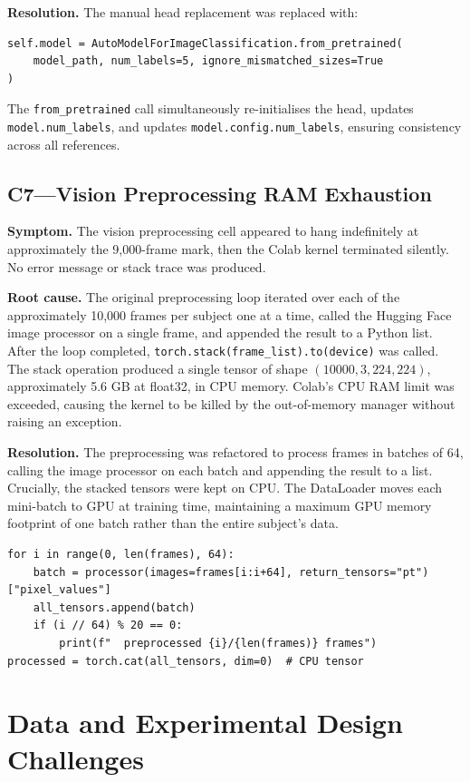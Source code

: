 \textbf{Resolution.} The manual head replacement was replaced with:

\begin{verbatim}
self.model = AutoModelForImageClassification.from_pretrained(
    model_path, num_labels=5, ignore_mismatched_sizes=True
)
\end{verbatim}

The \texttt{from\_pretrained} call simultaneously re-initialises the head, updates \texttt{model.num\_labels}, and updates \texttt{model.config.num\_labels}, ensuring consistency across all references.

\subsection*{C7---Vision Preprocessing RAM Exhaustion}
\textbf{Symptom.} The vision preprocessing cell appeared to hang indefinitely at approximately the 9,000-frame mark, then the Colab kernel terminated silently. No error message or stack trace was produced.

\textbf{Root cause.} The original preprocessing loop iterated over each of the approximately 10,000 frames per subject one at a time, called the Hugging Face image processor on a single frame, and appended the result to a Python list. After the loop completed, \texttt{torch.stack(frame\_list).to(device)} was called. The stack operation produced a single tensor of shape $(10000,3,224,224)$, approximately 5.6 GB at float32, in CPU memory. Colab's CPU RAM limit was exceeded, causing the kernel to be killed by the out-of-memory manager without raising an exception.

\textbf{Resolution.} The preprocessing was refactored to process frames in batches of 64, calling the image processor on each batch and appending the result to a list. Crucially, the stacked tensors were kept on CPU. The DataLoader moves each mini-batch to GPU at training time, maintaining a maximum GPU memory footprint of one batch rather than the entire subject's data.

\begin{verbatim}
for i in range(0, len(frames), 64):
    batch = processor(images=frames[i:i+64], return_tensors="pt")["pixel_values"]
    all_tensors.append(batch)
    if (i // 64) % 20 == 0:
        print(f"  preprocessed {i}/{len(frames)} frames")
processed = torch.cat(all_tensors, dim=0)  # CPU tensor
\end{verbatim}

\section{Data and Experimental Design Challenges}
